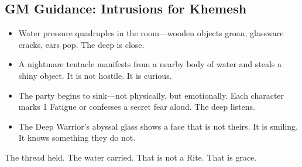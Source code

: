 \subsection{GM Guidance: Intrusions for Khemesh}

\begin{itemize}
\item Water pressure quadruples in the room—wooden objects groan, glassware cracks, ears pop. The deep is close.
\item A nightmare tentacle manifests from a nearby body of water and steals a shiny object. It is not hostile. It is curious.
\item The party begins to sink—not physically, but emotionally. Each character marks 1 Fatigue or confesses a secret fear aloud. The deep listens.
\item The Deep Warrior's abyssal glass shows a face that is not theirs. It is smiling. It knows something they do not.
\end{itemize}

The thread held. The water carried. That is not a Rite. That is grace.
